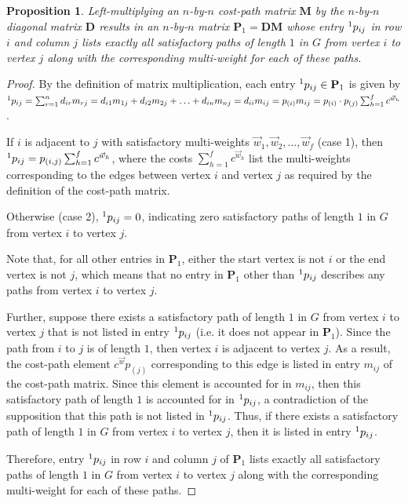 \documentclass[12pt]{amsart}
\newtheorem{prop}[thm]{Proposition}
\theoremstyle{definition}
\theoremstyle{remark}
\numberwithin{equation}{section}
\begin{document}
\begin{prop}
Left-multiplying an $n$-by-$n$ cost-path matrix $\mathbf{M}$ by the $n$-by-$n$ diagonal matrix $\mathbf{D}$ results in an $n$-by-$n$ matrix $\mathbf{P}_1 = \mathbf{D}\mathbf{M}$ whose entry $\prescript{1}{}{p_{ij}}$ in row $i$ and column $j$ lists exactly all satisfactory paths of length $1$ in $G$ from vertex $i$ to vertex $j$ along with the corresponding multi-weight for each of these paths.
\end{prop}

\begin{proof}
By the definition of matrix multiplication, each entry $\prescript{1}{}{p_{ij}} \in \mathbf{P}_1$ is given by $\prescript{1}{}{p_{ij}} = \sum_{r=1}^n d_{ir} m_{rj} = d_{i1}m_{1j} + d_{i2}m_{2j} + \ldots + d_{in}m_{nj} = d_{ii}m_{ij} = p_{(i)} m_{ij} = p_{(i)} \cdot p_{(j)} \sum_{h=1}^f c^{\vec{w}_h}$.

If $i$ is adjacent to $j$ with satisfactory multi-weights $\vec{w}_1, \vec{w}_2, \ldots, \vec{w}_f$ (case 1), then $\prescript{1}{}{p_{ij}} = p_{(i,j)} \sum_{h=1}^f c^{\vec{w}_h}$, where the costs $\sum_{h=1}^f c^{\vec{w}_h}$ list the multi-weights corresponding to the edges between vertex $i$ and vertex $j$ as required by the definition of the cost-path matrix.

Otherwise (case 2), $\prescript{1}{}{p_{ij}} = 0$, indicating zero satisfactory paths of length $1$ in $G$ from vertex $i$ to vertex $j$.

Note that, for all other entries in $\mathbf{P}_1$, either the start vertex is not $i$ or the end vertex is not $j$, which means that no entry in $\mathbf{P}_1$ other than $\prescript{1}{}{p_{ij}}$ describes any paths from vertex $i$ to vertex $j$.

Further, suppose there exists a satisfactory path of length $1$ in $G$ from vertex $i$ to vertex $j$ that is not listed in entry $\prescript{1}{}{p_{ij}}$ (i.e. it does not appear in $\mathbf{P}_1$). Since the path from $i$ to $j$ is of length $1$, then vertex $i$ is adjacent to vertex $j$. As a result, the cost-path element $c^{\vec{w}} p_{(j)}$ corresponding to this edge is listed in entry $m_{ij}$ of the cost-path matrix. Since this element is accounted for in $m_{ij}$, then this satisfactory path of length $1$ is accounted for in $\prescript{1}{}{p_{ij}}$, a contradiction of the supposition that this path is not listed in $\prescript{1}{}{p_{ij}}$. Thus, if there exists a satisfactory path of length $1$ in $G$ from vertex $i$ to vertex $j$, then it is listed in entry $\prescript{1}{}{p_{ij}}$.

Therefore, entry $\prescript{1}{}{p_{ij}}$ in row $i$ and column $j$ of $\mathbf{P}_1$ lists exactly all satisfactory paths of length $1$ in $G$ from vertex $i$ to vertex $j$ along with the corresponding multi-weight for each of these paths.
\end{proof}
\end{document}
